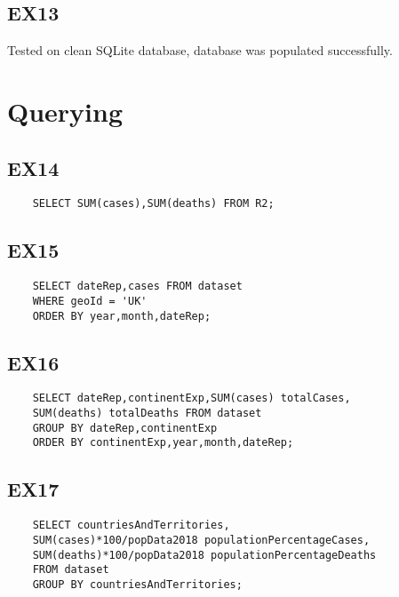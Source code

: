 \documentclass[12pt]{extarticle}
\begin{document}
    \subsection{EX13}
    Tested on clean SQLite database, database was populated successfully.
    
\vspace{0.4cm}
\section{Querying}
    \vspace{0.4cm}
    \subsection{EX14}
    \lstset{language=SQL}
    \begin{lstlisting}
    SELECT SUM(cases),SUM(deaths) FROM R2;
    \end{lstlisting}
    
    \vspace{0.4cm}
    \subsection{EX15}
    \lstset{language=SQL}
    \begin{lstlisting}
    SELECT dateRep,cases FROM dataset
    WHERE geoId = 'UK'
    ORDER BY year,month,dateRep;
    \end{lstlisting}
    
    \vspace{1.7cm}
    \subsection{EX16}
    \lstset{language=SQL}
    \begin{lstlisting}
    SELECT dateRep,continentExp,SUM(cases) totalCases, 
    SUM(deaths) totalDeaths FROM dataset 
    GROUP BY dateRep,continentExp
    ORDER BY continentExp,year,month,dateRep;
    \end{lstlisting}
    
    \vspace{0.4cm}
    \subsection{EX17}
    \lstset{language=SQL}
    \begin{lstlisting}
    SELECT countriesAndTerritories,
    SUM(cases)*100/popData2018 populationPercentageCases, 
    SUM(deaths)*100/popData2018 populationPercentageDeaths 
    FROM dataset
    GROUP BY countriesAndTerritories;
    \end{lstlisting}
    
\end{document}
